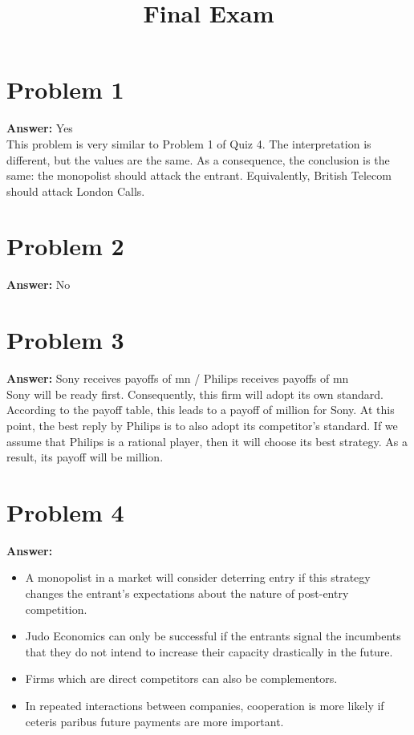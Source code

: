 \documentclass[11pt]{article}
\date{}
\title{Final Exam}
\begin{document}
\thispagestyle{empty}
\pagestyle{empty}
\section*{Problem 1}
\label{sec:org0e92ef2}

\textbf{Answer:} Yes\\

This problem is very similar to Problem 1 of Quiz 4. The interpretation is
different, but the values are the same. As a consequence, the conclusion is
the same: the monopolist should attack the entrant. Equivalently, British
Telecom should attack London Calls.
\section*{Problem 2}
\label{sec:org9bef3ba}

\textbf{Answer:} No
\section*{Problem 3}
\label{sec:orga6d71b4}

\textbf{Answer:} Sony receives payoffs of  mn / Philips receives payoffs
of  mn\\

Sony will be ready first. Consequently, this firm will adopt its own
standard. According to the payoff table, this leads to a payoff of
 million for Sony. At this point, the best reply by Philips is to
also adopt its competitor's standard. If we assume that Philips is a
rational player, then it will choose its best strategy. As a result, its
payoff will be  million.
\section*{Problem 4}
\label{sec:org45102b2}

\textbf{Answer:}
\begin{itemize}
\item A monopolist in a market will consider deterring entry if this strategy
changes the entrant's expectations about the nature of post-entry
competition.
\item Judo Economics can only be successful if the entrants signal the
incumbents that they do not intend to increase their capacity drastically
in the future.
\item Firms which are direct competitors can also be complementors.
\item In repeated interactions between companies, cooperation is more likely if
ceteris paribus future payments are more important.
\end{itemize}
\end{document}
